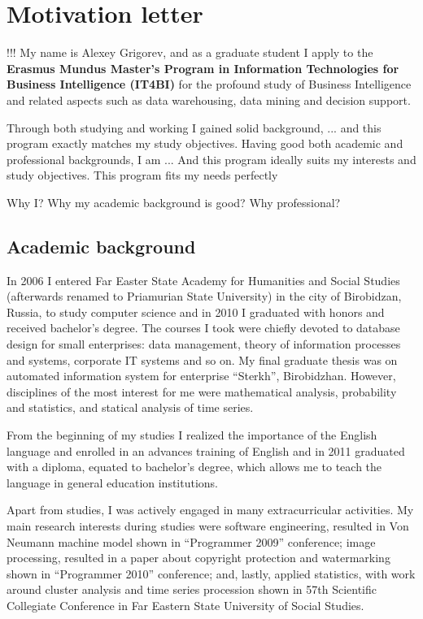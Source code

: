 \documentclass[a4paper,14pt]{extarticle}
\begin{document}
\section*{Motivation letter}

!!!
My name is Alexey Grigorev, and as a graduate student I apply to the \textbf{Erasmus Mundus Master's Program in Information Technologies for Business Intelligence (IT4BI)} for the profound study of Business Intelligence and related aspects such as data warehousing, data mining and decision support.

Through both studying and working I gained solid background, ...  and this program exactly matches my study objectives. Having good both academic and professional backgrounds, I am ... And this program ideally suits my interests and study objectives.
This program fits my needs perfectly

Why I? Why my academic background is good? Why professional?

\subsection*{Academic background}

In 2006 I entered Far Easter State Academy for Humanities and Social Studies (afterwards renamed to Priamurian State University) in the city of Birobidzan, Russia, to study computer science and in 2010 I graduated with honors and received bachelor's degree. The courses I took were chiefly devoted to database design for small enterprises: data management, theory of information processes and systems, corporate IT systems and so on. My final graduate thesis was on automated information system for enterprise ``Sterkh'', Birobidzhan. However, disciplines of the most interest for me were mathematical analysis, probability and statistics, and statical analysis of time series.

From the beginning of my studies I realized the importance of the English language and enrolled in an advances training of English and in 2011 graduated with a diploma, equated to bachelor's degree, which allows me to teach the language in general education institutions.

Apart from studies, I was actively engaged in many extracurricular activities. My main research interests during studies were software engineering, resulted in Von Neumann machine model shown in ``Programmer 2009'' conference; image processing, resulted in a paper about copyright protection and watermarking shown in ``Programmer 2010'' conference; and, lastly, applied statistics, with work around cluster analysis and time series procession shown in 57th Scientific Collegiate Conference in Far Eastern State University of Social Studies.
\end{document}
